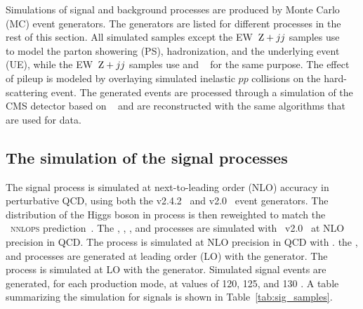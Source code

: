Simulations of signal and background processes are produced by Monte Carlo (MC) event generators.
The generators are listed for different processes in the rest of this section.
All simulated samples except the EW~$\mathrm{Z}+jj$ samples use ~\cite{SJOSTRAND2015159} to model the parton showering (PS), 
hadronization, and the underlying event (UE), while the EW~$\mathrm{Z}+jj$ samples use \HERWIGpp and \HERWIGSeven~\cite{Bellm:2015jjp} for the same purpose.
The effect of pileup is modeled by overlaying simulated inelastic $pp$ collisions on the hard-scattering event.
The generated events are processed through a simulation of the CMS detector based on \GEANTfour~\cite{AGOSTINELLI2003250}
and are reconstructed with the same algorithms that are used for data.

\bigskip
\subsection{The simulation of the signal processes}
The \ggH signal process is simulated at next-to-leading order (NLO) accuracy in perturbative QCD, using both the \MGvATNLO v2.4.2~\cite{Alwall:2014hca}
and \POWHEG v2.0~\cite{Nason_2004, Frixione_2007, Alioli:2010xd, Bagnaschi:2011tu} event generators. 
The \pt distribution of the Higgs boson in \ggH process is then reweighted to match the \POWHEG~\textsc{nnlops} prediction~\cite{Hamilton:2013fea,Hamilton:2015nsa}. 
The \qqH, \WH, \qqZH, and \ttH processes are simulated with \POWHEG~v2.0~\cite{Nason:2009ai,Luisoni:2013kna,Hartanto:2015uka} at NLO precision in QCD. 
The \bbH process is simulated at NLO precision in QCD with \POWHEG.
the \tHq, and \tHW processes are generated at leading order (LO) with the \MGvATNLO generator.
The \ggZH process is simulated at LO with the \POWHEG generator.
Simulated signal events are generated, for each production mode, at \mh values of 120, 125, and 130 \GeV.
A table summarizing the simulation for signals is shown in Table~\ref{tab:sig_samples}.

